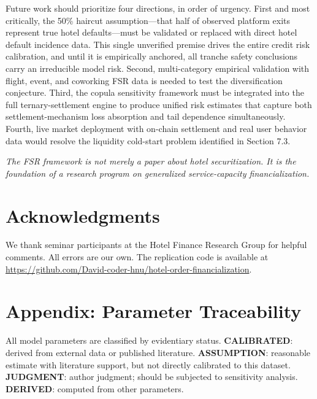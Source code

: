 \documentclass[12pt,a4paper]{article}
\begin{document}
Future work should prioritize four directions, in order of urgency.
First and most critically, the 50\% haircut assumption---that half of observed platform exits represent true hotel defaults---must be validated or replaced with direct hotel default incidence data. This single unverified premise drives the entire credit risk calibration, and until it is empirically anchored, all tranche safety conclusions carry an irreducible model risk.
Second, multi-category empirical validation with flight, event, and coworking FSR data is needed to test the diversification conjecture.
Third, the copula sensitivity framework must be integrated into the full ternary-settlement engine to produce unified risk estimates that capture both settlement-mechanism loss absorption and tail dependence simultaneously.
Fourth, live market deployment with on-chain settlement and real user behavior data would resolve the liquidity cold-start problem identified in Section 7.3.

\medskip
\noindent\textit{The FSR framework is not merely a paper about hotel securitization. It is the foundation of a research program on generalized service-capacity financialization.}

\section*{Acknowledgments}

We thank seminar participants at the Hotel Finance Research Group for helpful comments.
All errors are our own. The replication code is available at \url{https://github.com/David-coder-hnu/hotel-order-financialization}.

\section*{Appendix: Parameter Traceability}

All model parameters are classified by evidentiary status.
\textbf{CALIBRATED}: derived from external data or published literature.
\textbf{ASSUMPTION}: reasonable estimate with literature support, but not directly calibrated to this dataset.
\textbf{JUDGMENT}: author judgment; should be subjected to sensitivity analysis.
\textbf{DERIVED}: computed from other parameters.
\end{document}

